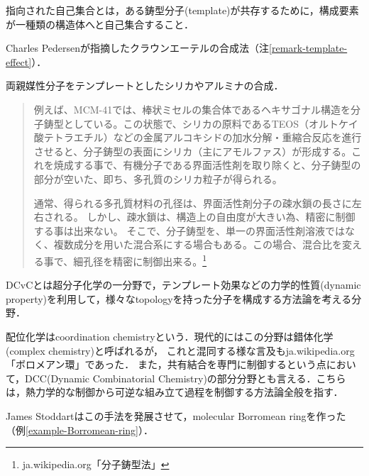 \documentclass[uplatex, dvipdfmx]{jsreport}
\begin{document}
\begin{definition}
    指向された自己集合とは，ある鋳型分子(template)が共存するために，構成要素が一種類の構造体へと自己集合すること．
\end{definition}
\begin{example}
    Charles Pedersenが指摘したクラウンエーテルの合成法（注\ref{remark-template-effect}）．
\end{example}
\begin{example}
    両親媒性分子をテンプレートとしたシリカやアルミナの合成．
    \begin{quote}
        例えば、MCM-41では、棒状ミセルの集合体であるヘキサゴナル構造を分子鋳型としている。この状態で、シリカの原料であるTEOS（オルトケイ酸テトラエチル）などの金属アルコキシドの加水分解・重縮合反応を進行させると、分子鋳型の表面にシリカ（主にアモルファス）が形成する。これを焼成する事で、有機分子である界面活性剤を取り除くと、分子鋳型の部分が空いた、即ち、多孔質のシリカ粒子が得られる。

        通常、得られる多孔質材料の孔径は、界面活性剤分子の疎水鎖の長さに左右される。 しかし、疎水鎖は、構造上の自由度が大きい為、精密に制御する事は出来ない。 そこで、分子鋳型を、単一の界面活性剤溶液ではなく、複数成分を用いた混合系にする場合もある。この場合、混合比を変える事で、細孔径を精密に制御出来る。\footnote{ja.wikipedia.org「分子鋳型法」}
    \end{quote}
\end{example}

\begin{definition}
    DCvCとは超分子化学の一分野で，テンプレート効果などの力学的性質(dynamic property)を利用して，様々なtopologyを持った分子を構成する方法論を考える分野．
\end{definition}
\begin{remark}
    配位化学はcoordination chemistryという．現代的にはこの分野は錯体化学(complex chemistry)と呼ばれるが，
    これと混同する様な言及もja.wikipedia.org「ボロメアン環」であった．
    また，共有結合を専門に制御するという点において，DCC(Dynamic Combinatorial Chemistry)の部分分野とも言える．こちらは，熱力学的な制御から可逆な組み立て過程を制御する方法論全般を指す．
\end{remark}
\begin{example}
    James Stoddartはこの手法を発展させて，molecular Borromean ringを作った（例\ref{example-Borromean-ring}）．
\end{example}
\end{document}
